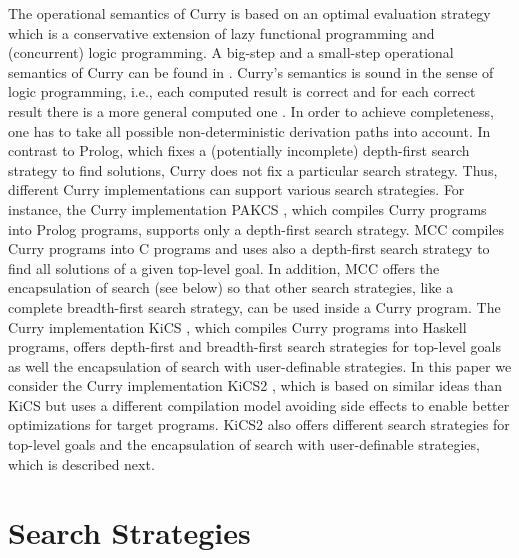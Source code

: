 \documentclass[english]{lni}
\begin{document}
The operational semantics of Curry is based on an optimal evaluation strategy
\cite{AntoyEchahedHanus00JACM} which is a conservative extension
of lazy functional programming and (concurrent) logic programming.
A big-step and a small-step operational semantics of Curry
can be found in \cite{AlbertHanusHuchOliverVidal05}.
Curry's semantics is sound in the sense of logic programming,
i.e., each computed result is correct and for each
correct result there is a more general computed one
\cite{AntoyEchahedHanus00JACM}.
In order to achieve completeness,
one has to take all possible non-deterministic derivation paths
into account. In contrast to Prolog, which fixes
a (potentially incomplete) depth-first search strategy to find solutions,
Curry does not fix a particular search strategy.
Thus, different Curry implementations
can support various search strategies.
For instance, the Curry implementation PAKCS \cite{Hanus10PAKCS},
which compiles Curry programs into Prolog programs,
supports only a depth-first search strategy.
MCC \cite{Lux99FLOPS} compiles Curry programs into C programs
and uses also a depth-first search strategy to find all
solutions of a given top-level goal.
In addition, MCC offers the encapsulation of search
(see below) so that other search strategies,
like a complete breadth-first search strategy, can be used
inside a Curry program.
The Curry implementation KiCS \cite{BrasselHuch07,BrasselHuch09},
which compiles Curry programs into Haskell programs,
offers depth-first and breadth-first search strategies
for top-level goals as well the encapsulation of search
with user-definable strategies.
In this paper we consider the Curry implementation
KiCS2 \cite{BrasselHanusPeemoellerReck11},
which is based on similar ideas than KiCS but uses
a different compilation model avoiding side effects
to enable better optimizations for target programs.
KiCS2 also offers different search strategies for top-level goals
and the encapsulation of search with user-definable strategies,
which is described next.

\section{Search Strategies}
\label{sec:strategies}
\end{document}
